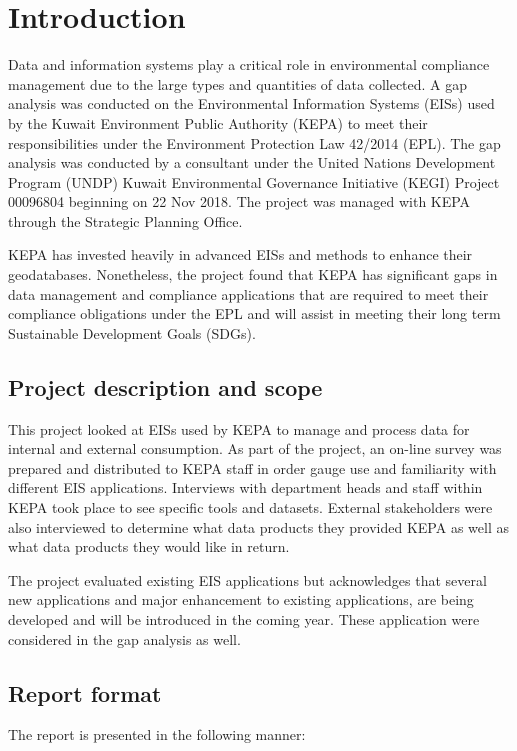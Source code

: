 \chapter{Introduction} 

Data and information systems play a critical role in environmental compliance management due to the large types and quantities of data collected. A gap analysis was conducted on the Environmental Information Systems (EISs) used by the Kuwait Environment Public Authority (KEPA) to meet their responsibilities under the Environment Protection Law 42/2014 (EPL). The gap analysis was conducted by a consultant under the United Nations Development Program (UNDP) Kuwait Environmental Governance Initiative (KEGI) Project 00096804 beginning on 22 Nov 2018. The project was managed with KEPA through the Strategic Planning Office.

KEPA has invested heavily in advanced EISs and methods to enhance their geodatabases. Nonetheless, the project found that KEPA has significant gaps in data management and compliance applications that are required to meet their compliance obligations under the EPL and will assist in meeting their long term Sustainable Development Goals (SDGs).

\section{Project description and scope}

This project looked at EISs used by KEPA to manage and process data for internal and external consumption. As part of the project, an on-line survey was prepared and distributed to KEPA staff in order gauge use and familiarity with different EIS applications. Interviews with department heads and staff within KEPA took place to see specific tools and datasets. External stakeholders were also interviewed to determine what data products they provided KEPA as well as what data products they would like in return.

The project evaluated existing EIS applications but acknowledges that several new applications and major enhancement to existing applications, are being developed and will be introduced in the coming year. These application were considered in the gap analysis as well.


\section{Report format}
The report is presented in the following manner:

